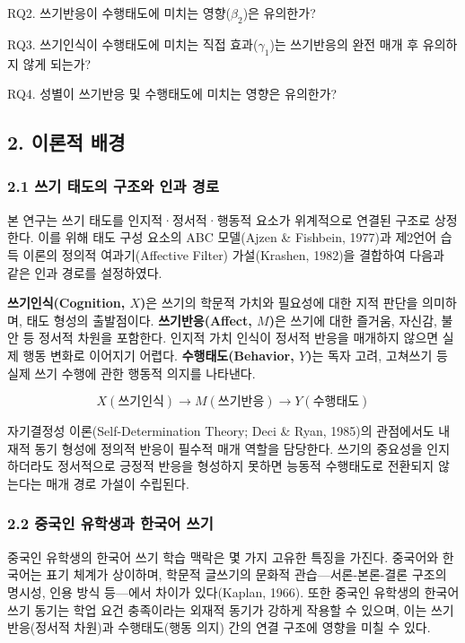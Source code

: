 \documentclass[a4paper,10pt]{oblivoir}
\begin{document}
RQ2. 쓰기반응이 수행태도에 미치는 영향($\beta_2$)은 유의한가?

RQ3. 쓰기인식이 수행태도에 미치는 직접 효과($\gamma_1$)는 쓰기반응의 완전 매개 후 유의하지 않게 되는가?

RQ4. 성별이 쓰기반응 및 수행태도에 미치는 영향은 유의한가?


\subsection{2. 이론적 배경}

\subsubsection{2.1 쓰기 태도의 구조와 인과 경로}

본 연구는 쓰기 태도를 인지적·정서적·행동적 요소가 위계적으로 연결된 구조로 상정한다. 이를 위해 태도 구성 요소의 ABC 모델(Ajzen \& Fishbein, 1977)과 제2언어 습득 이론의 정의적 여과기(Affective Filter) 가설(Krashen, 1982)을 결합하여 다음과 같은 인과 경로를 설정하였다.

\textbf{쓰기인식(Cognition, $X$)}은 쓰기의 학문적 가치와 필요성에 대한 지적 판단을 의미하며, 태도 형성의 출발점이다. \textbf{쓰기반응(Affect, $M$)}은 쓰기에 대한 즐거움, 자신감, 불안 등 정서적 차원을 포함한다. 인지적 가치 인식이 정서적 반응을 매개하지 않으면 실제 행동 변화로 이어지기 어렵다. \textbf{수행태도(Behavior, $Y$)}는 독자 고려, 고쳐쓰기 등 실제 쓰기 수행에 관한 행동적 의지를 나타낸다.

\[X(\text{쓰기인식}) \rightarrow M(\text{쓰기반응}) \rightarrow Y(\text{수행태도})\]

자기결정성 이론(Self-Determination Theory; Deci \& Ryan, 1985)의 관점에서도 내재적 동기 형성에 정의적 반응이 필수적 매개 역할을 담당한다. 쓰기의 중요성을 인지하더라도 정서적으로 긍정적 반응을 형성하지 못하면 능동적 수행태도로 전환되지 않는다는 매개 경로 가설이 수립된다.

\subsubsection{2.2 중국인 유학생과 한국어 쓰기}

중국인 유학생의 한국어 쓰기 학습 맥락은 몇 가지 고유한 특징을 가진다. 중국어와 한국어는 표기 체계가 상이하며, 학문적 글쓰기의 문화적 관습—서론-본론-결론 구조의 명시성, 인용 방식 등—에서 차이가 있다(Kaplan, 1966). 또한 중국인 유학생의 한국어 쓰기 동기는 학업 요건 충족이라는 외재적 동기가 강하게 작용할 수 있으며, 이는 쓰기반응(정서적 차원)과 수행태도(행동 의지) 간의 연결 구조에 영향을 미칠 수 있다.
\end{document}
